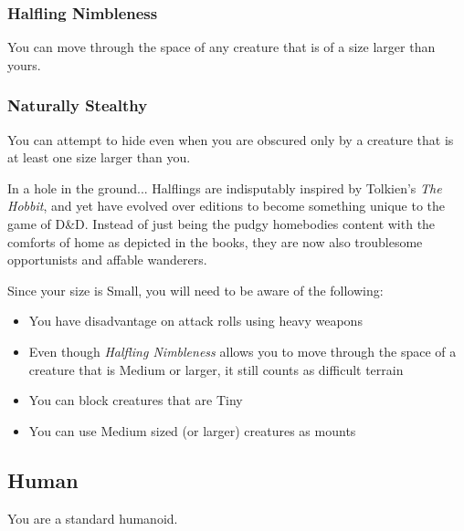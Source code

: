 \documentclass[10pt,twoside]{article}
\begin{document}
\begin{multicols}{2}
\subsubsection*{Halfling Nimbleness}
You can move through the space of any creature that is of a size larger than yours.

\subsubsection*{Naturally Stealthy}
You can attempt to hide even when you are obscured only by a creature that is at least one size larger than you.

\begin{commentbox}{In a hole in the ground...}
Halflings are indisputably inspired by Tolkien's \textit{The Hobbit}, and yet have evolved over editions to become something unique to the game of D\&D. Instead of just being the pudgy homebodies content with the comforts of home as depicted in the books, they are now also troublesome opportunists and affable wanderers.

Since your size is Small, you will need to be aware of the following:

\begin{itemize}
\item You have disadvantage on attack rolls using heavy weapons

\item Even though \textit{Halfling Nimbleness} allows you to move through the space of a creature that is Medium or larger, it still counts as difficult terrain

\item You can block creatures that are Tiny

\item You can use Medium sized (or larger) creatures as mounts
\end{itemize}

\end{commentbox}

\end{multicols}

\newpage


\subsection{Human}

You are a standard humanoid.
\end{document}
